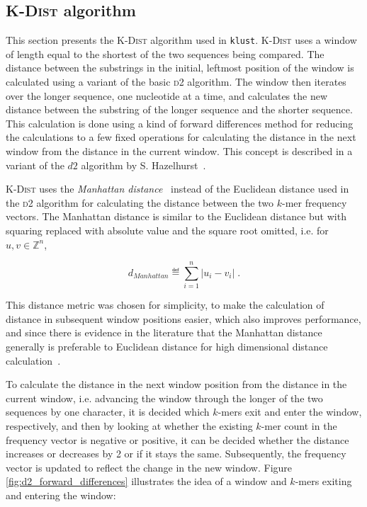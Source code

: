 \subsection{\textsc{K-Dist} algorithm}

This section presents the \textsc{K-Dist} algorithm used in \texttt{klust}.
\textsc{K-Dist} uses a window of length equal to the shortest of the two
sequences being compared. The distance between the substrings in the initial,
leftmost position of the window is calculated using a variant of the basic
\textsc{d2} algorithm. The window then iterates over the longer sequence, one
nucleotide at a time, and calculates the new distance between the substring of
the longer sequence and the shorter sequence.  This calculation is done using
a kind of forward differences method for reducing the calculations to a few
fixed operations for calculating the distance in the next window from the
distance in the current window. This concept is described in a variant of the
$d2$ algorithm by S. Hazelhurst~\cite{hazelhurst}.

\textsc{K-Dist} uses the \emph{Manhattan distance}~\cite{upton} instead of the
Euclidean distance used in the \textsc{d2} algorithm for calculating the
distance between the two $k$-mer frequency vectors. The Manhattan distance is
similar to the Euclidean distance but with squaring replaced with absolute
value and the square root omitted, i.e.  for $u, v \in \mathbb{Z}^n$,

\begin{equation*}
  d_{Manhattan} \eqdef \sum_{i=1}^{n} |u_i - v_i| \;.
\end{equation*}

This distance metric was chosen for simplicity, to make the calculation of
distance in subsequent window positions easier, which also improves
performance, and since there is evidence in the literature that the Manhattan
distance generally is preferable to Euclidean distance for high dimensional
distance calculation~\cite{aggarwal}. 

To calculate the distance in the next window position from the distance in the
current window, i.e. advancing the window through the longer of the two
sequences by one character, it is decided which $k$-mers exit and enter the
window, respectively, and then by looking at whether the existing $k$-mer count
in the frequency vector is negative or positive, it can be decided whether the
distance increases or decreases by 2 or if it stays the same.
Subsequently, the frequency vector is updated to reflect the change in the new
window. Figure \ref{fig:d2_forward_differences} illustrates the idea of a
window and $k$-mers exiting and entering the window:

